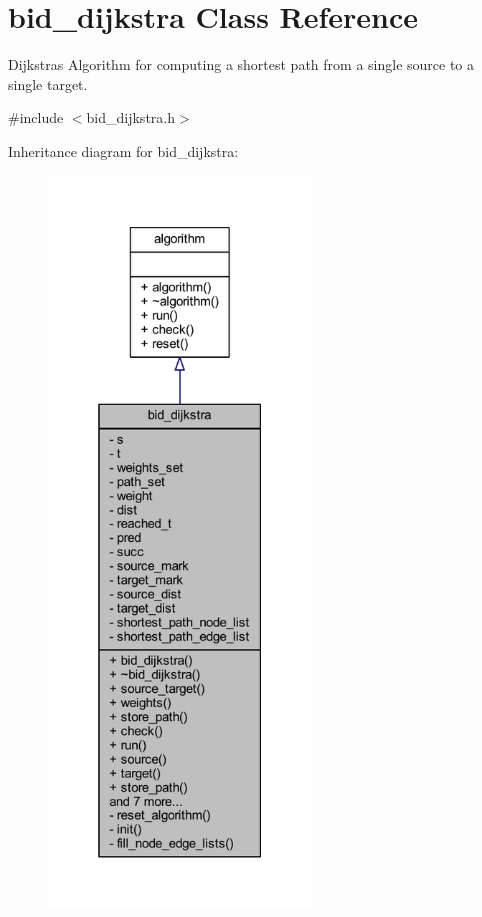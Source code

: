 \hypertarget{classbid__dijkstra}{}\section{bid\+\_\+dijkstra Class Reference}
\label{classbid__dijkstra}


Dijkstra\textquotesingle{}s Algorithm for computing a shortest path from a single source to a single target.  




{\ttfamily \#include $<$bid\+\_\+dijkstra.\+h$>$}



Inheritance diagram for bid\+\_\+dijkstra\+:\nopagebreak
\begin{figure}[H]
\begin{center}
\leavevmode
\includegraphics[height=550pt]{classbid__dijkstra__inherit__graph}
\end{center}
\end{figure}


